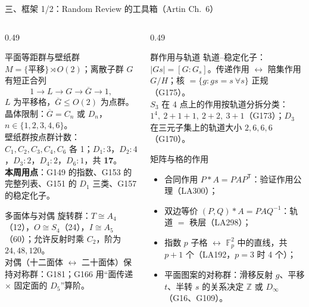 \documentclass[aspectratio=169,10pt,fontset=none]{ctexbeamer}
\newcommand{\key}[1]{\textcolor{ink}{\bfseries #1}}
\begin{document}
\begin{frame}[t]{三、框架 1/2：Random Review 的工具箱（Artin Ch.~6）}
  \label{sec:framework1}
  \begin{columns}[T,onlytextwidth]
    \begin{column}{0.49\textwidth}
      \begin{block}{\footnotesize 平面等距群与壁纸群}
        \scriptsize
        $M=\{\text{平移}\}\rtimes O(2)$；离散子群 $G$ 有短正合列
        \[ 1\to L\to G\to \overline G\to 1, \]
        $L$ 为平移格，$\overline G\le O(2)$ 为点群。晶体限制：$\overline G=C_n$ 或 $D_n$，$n\in\{1,2,3,4,6\}$。\\[1pt]
        壁纸群按点群计数：$C_1,C_2,C_3,C_4,C_6$ 各 1；$D_1:3$，$D_2:4$，$D_3:2$，$D_4:2$，$D_6:1$，共 \textbf{17}。\\
        \key{本周用点}：G149 的指数、G153 的完整列表、G151 的 $D_1$ 三类、G157 的稳定化子。
      \end{block}
      \begin{block}{\footnotesize 多面体与对偶}
        \scriptsize
        旋转群：$T\cong A_4$（12），$O\cong S_4$（24），$I\cong A_5$（60）；允许反射时乘 $C_2$，阶为 $24,48,120$。\\[1pt]
        对偶（十二面体 $\leftrightarrow$ 二十面体）保持对称群：G181；G166 用“面传递 $\times$ 固定面的 $D_5$”算阶。
      \end{block}
    \end{column}
    \begin{column}{0.49\textwidth}
      \begin{block}{\footnotesize 群作用与轨道}
        \scriptsize
        轨道--稳定化子：$|Gs|=[G:G_s]$。传递作用 $\leftrightarrow$ 陪集作用 $G/H$；核 $=\{g:gs=s\ \forall s\}$ 正规（G175）。\\
        $S_3$ 在 4 点上的作用按轨道分拆分类：$1^4,\ 2+1+1,\ 2+2,\ 3+1$（G173）；$D_3$ 在三元子集上的轨道大小 $2,6,6,6$（G170）。
      \end{block}
      \begin{block}{\footnotesize 矩阵与格的作用}
        \scriptsize
        \begin{itemize}\setlength{\itemsep}{0pt}
          \item 合同作用 $P*A=PAP^{\mathsf T}$：验证作用公理（LA300）；
          \item 双边等价 $(P,Q)*A=PAQ^{-1}$：轨道 $=$ 秩层（LA298）；
          \item 指数 $p$ 子格 $\leftrightarrow$ $\mathbb F_p^2$ 中的直线，共 $p+1$ 个（LA192，$p=3$ 时 4 个）；
          \item 平面图案的对称群：滑移反射 $g$、平移 $t$、半转 $s$ 的关系决定 $\mathbb Z$ 或 $D_\infty$（G16、G109）。
        \end{itemize}
      \end{block}
    \end{column}
  \end{columns}
\end{frame}
\end{document}
